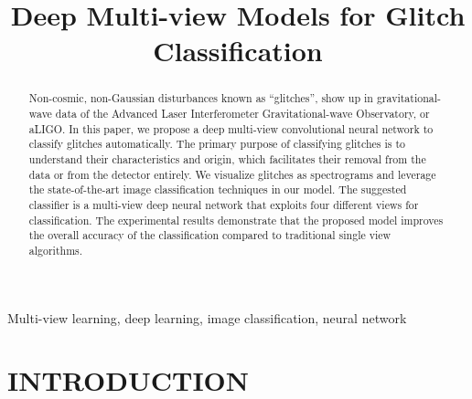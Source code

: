 \documentclass{article}
\title{Deep Multi-view Models for Glitch Classification}
\begin{document}
%
\maketitle
%










\thispagestyle{empty}
\pagestyle{empty}


\begin{abstract}
Non-cosmic, non-Gaussian disturbances known as ``glitches'', show up in gravitational-wave data of the Advanced Laser Interferometer Gravitational-wave Observatory, or aLIGO. In this paper, we propose a deep multi-view convolutional neural network to classify glitches automatically. The primary purpose of classifying glitches is to understand their characteristics and origin, which facilitates their removal from the data or from the detector entirely.
We visualize glitches as spectrograms and leverage the state-of-the-art image classification techniques in our model. The suggested classifier is a multi-view deep neural network that exploits four different views for classification. The experimental results demonstrate that the proposed model improves the overall accuracy of the classification compared to traditional single view algorithms.
\end{abstract}

\begin{keywords}
Multi-view learning, deep learning, image classification, neural network
\end{keywords}
\section{INTRODUCTION}
\end{document}
